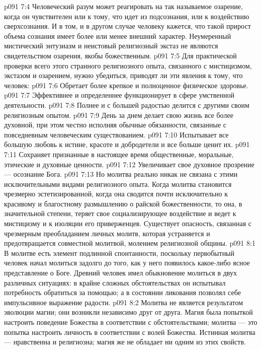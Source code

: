 \vs p091 7:4 Человеческий разум может реагировать на так называемое озарение, когда он чувствителен или к тому, что идет из подсознания, или к воздействию сверхсознания. И в том, и в другом случае человеку кажется, что такой прирост объема сознания имеет более или менее внешний характер. Неумеренный мистический энтузиазм и неистовый религиозный экстаз не являются свидетельством озарения, якобы божественным.
\vs p091 7:5 Для практической проверки всего этого странного религиозного опыта, связанного с мистицизмом, экстазом и озарением, нужно убедиться, приводят ли эти явления к тому, что человек:
\vs p091 7:6 \bibnobreakspace Обретает более крепкое и полноценное физическое здоровье.
\vs p091 7:7 \bibnobreakspace Эффективнее и определеннее функционирует в сфере умственной деятельности.
\vs p091 7:8 \bibnobreakspace Полнее и с большей радостью делится с другими своим религиозным опытом.
\vs p091 7:9 \bibnobreakspace День за днем делает свою жизнь все более духовной, при этом честно исполняя обычные обязанности, связанные с повседневным человеческим существованием.
\vs p091 7:10 \bibnobreakspace Испытывает все большую любовь к истине, красоте и добродетели и все больше ценит их.
\vs p091 7:11 \bibnobreakspace Сохраняет признанные в настоящее время общественные, моральные, этические и духовные ценности.
\vs p091 7:12 \bibnobreakspace Увеличивает свое духовное прозрение --- осознание Бога.
\vs p091 7:13 \pc Но молитва реально никак не связана с этими исключительными видами религиозного опыта. Когда молитва становится чрезмерно эстетизированной, когда она сводится почти исключительно к красивому и благостному размышлению о райской божественности, то она, в значительной степени, теряет свое социализирующее воздействие и ведет к мистицизму и к изоляции его приверженцев. Существует опасность, связанная с чрезмерным преобладанием личных молитв, которая устраняется и предотвращается совместной молитвой, молением религиозной общины.
\vs p091 8:1 В молитве есть элемент подлинной спонтанности, поскольку первобытный человек начал молиться задолго до того, как у него появилось какое\hyp{}либо ясное представление о Боге. Древний человек имел обыкновение молиться в двух различных ситуациях: в крайне сложных обстоятельствах он испытывал потребность обратиться за помощью; а в состоянии ликования позволял себе импульсивное выражение радости.
\vs p091 8:2 \pc Молитва не является результатом эволюции магии; они возникли независимо друг от друга. Магия была попыткой настроить поведение Божества в соответствии с обстоятельствами; молитва --- это попытка настроить личность в соответствии с волей Божества. Истинная молитва --- нравственна и религиозна; магия же не обладает ни одним из этих свойств.

